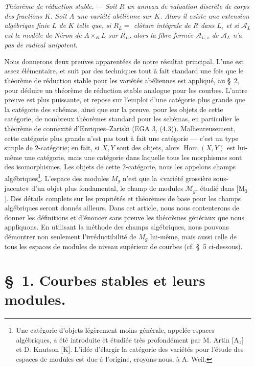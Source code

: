\documentclass[10pt]{article}
\newcommand{\Hom}{\operatorname{Hom}}
\newcommand{\cA}{\mathcal A}
\begin{document}
\medskip
\noindent\textit{Théorème de réduction stable.} --- \textit{Soit $R$ un anneau de valuation discrète de corps des fractions $K$. Soit $A$ une variété abélienne sur $K$. Alors il existe une extension algébrique finie $L$ de $K$ telle que, si $R_L={}$ clôture intégrale de $R$ dans $L$, et si $\cA_L$ est le modèle de Néron de $A\times_K L$ sur $R_L$, alors la fibre fermée $\cA_{L,s}$ de $\cA_L$ n'a pas de radical unipotent.}

Nous donnerons deux preuves apparentées de notre résultat principal. L'une est assez élémentaire, et suit par des techniques tout à fait standard une fois que le théorème de réduction stable pour les variétés abéliennes est appliqué, au \S~2, pour déduire un théorème de réduction stable analogue pour les courbes. L'autre preuve est plus puissante, et repose sur l'emploi d'une catégorie plus grande que la catégorie des schémas, ainsi que sur la preuve, pour les objets de cette catégorie, de nombreux théorèmes standard pour les schémas, en particulier le théorème de connexité d'Enriques--Zariski (EGA 3, (4.3)). Malheureusement, cette catégorie plus grande n'est pas tout à fait une catégorie --- c'est un type simple de 2-catégorie; en fait, si $X,Y$ sont des objets, alors $\Hom(X,Y)$ est lui-même une catégorie, mais une catégorie dans laquelle tous les morphismes sont des isomorphismes. Les objets de cette 2-catégorie, nous les appelons champs algébriques\footnote{Une catégorie d'objets légèrement moins générale, appelée espaces algébriques, a été introduite et étudiée très profondément par M. Artin [A$_1$] et D. Knutson [K]. L'idée d'élargir la catégorie des variétés pour l'étude des espaces de modules est due à l'origine, croyons-nous, à A. Weil.}. L'espace des modules $M_g$ n'est que la «variété grossière sous-jacente» d'un objet plus fondamental, le champ de modules $\mathcal M_g$, étudié dans [M$_3$]. Des détails complets sur les propriétés et théorèmes de base pour les champs algébriques seront donnés ailleurs. Dans cet article, nous nous contenterons de donner les définitions et d'énoncer sans preuve les théorèmes généraux que nous appliquons. En utilisant la méthode des champs algébriques, nous pouvons démontrer non seulement l'irréductibilité de $M_g$ lui-même, mais aussi celle de tous les espaces de modules de niveau supérieur de courbes (cf. \S~5 ci-dessous).

\section*{\S~1. Courbes stables et leurs modules.}
\end{document}
